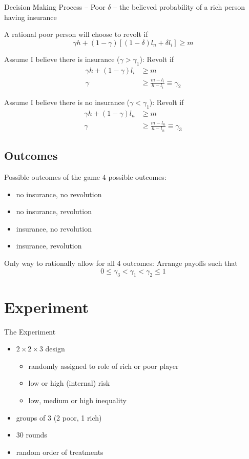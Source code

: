 \documentclass[mathserif]{beamer}
\begin{document}
	\begin{frame}{Decision Making Process -- Poor}
		$\delta$ -- the believed probability of a rich person having insurance
		
		\pause
		A rational poor person will choose to revolt if
		$$\gamma h + (1-\gamma)\left[ (1-\delta)l_n + \delta l_i \right] \geq m $$
		
		\pause
		Assume I believe there is insurance ($\gamma>\gamma_1$): Revolt if 
		\begin{align*}
			\gamma h + (1-\gamma)l_i &\geq m\\
			\gamma &\geq \frac{m-l_i}{h-l_i} \equiv \gamma_2
		\end{align*}
		
		\pause
		Assume I believe there is no insurance ($\gamma<\gamma_1$):	Revolt if
		\begin{align*}
			\gamma h + (1-\gamma)l_n &\geq m\\
			\gamma &\geq \frac{m-l_n}{h-l_n} \equiv \gamma_3
		\end{align*}
	\end{frame}
	
	\subsection{Outcomes}
	\begin{frame}{Possible outcomes of the game}
		4 possible outcomes:
		\begin{itemize}[<+->]
			\item no insurance, no revolution
			\item no insurance, revolution
			\item insurance, no revolution
			\item insurance, revolution
		\end{itemize}
		\pause
		Only way to rationally allow for all 4 outcomes: Arrange payoffs such that
		$$0 \leq \gamma_3 < \gamma_1 < \gamma_2 \leq 1$$
	\end{frame}
	
	\section{Experiment}
	\begin{frame}{The Experiment}
		\begin{itemize}[<+->]
			\item $2\times2\times3$ design
			\begin{itemize}
				\item randomly assigned to role of rich or poor player
				\item low or high (internal) risk
				\item low, medium or high inequality
			\end{itemize}
			\item groups of 3 (2 poor, 1 rich)
			\item 30 rounds
			\item random order of treatments
		\end{itemize}
	\end{frame}
	
\end{document}
